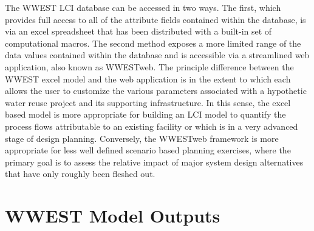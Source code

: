 The WWEST LCI database can be accessed in two ways. The first, which provides full access to all of the attribute fields contained within the database, is via an excel spreadsheet that has been distributed with a built-in set of computational macros. The second method exposes a more limited range of the data values contained within the database and is accessible via a streamlined web application, also known as WWESTweb. The principle difference between the WWEST excel model and the web application is in the extent to which each allows the user to customize the various parameters associated with a hypothetic water reuse project and its supporting infrastructure. In this sense, the excel based model is more appropriate for building an LCI model to quantify the process flows attributable to an existing facility or which is in a very advanced stage of design planning. Conversely, the WWESTweb framework is more appropriate for less well defined scenario based planning exercises, where the primary goal is to assess the relative impact of major system design alternatives that have only roughly been fleshed out.

\section{WWEST Model Outputs}